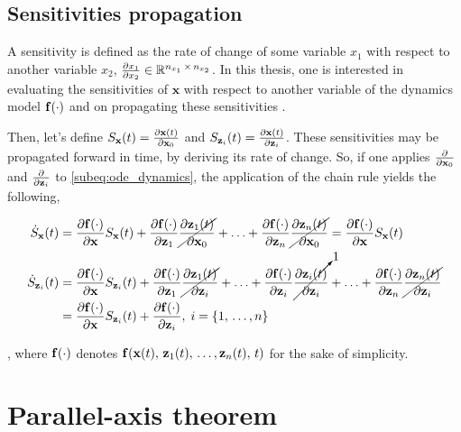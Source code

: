 \subsection*{Sensitivities propagation}
\label{subsection:sensitivitiespropagation}

A sensitivity is defined as the rate of change of some variable $x_1$ with respect to another variable $x_2$, $\pdv{x_1}{x_2} \in \mathbb{R}^{n_{x_1}\, \times\, n_{x_2}}$. In this thesis, one is interested in evaluating the sensitivities of $\mathbf{x}$ with respect to another variable of the dynamics model $\mathbf{f}(\cdot)$ and on propagating these sensitivities \cite{quirynen2015autogenerating}. 

Then, let's define $S_{\mathbf{x}}(t) = \pdv{\mathbf{x}(t)}{\mathbf{x}_0}$ and $S_{\mathbf{z}_i}(t) = \pdv{\mathbf{x}(t)}{\mathbf{z}_i}$. These sensitivities may be propagated forward in time, by deriving its rate of change. So, if one applies $\pdv{}{\mathbf{x}_0}$ and $\pdv{}{\mathbf{z}_i}$  to \ref{subeq:ode_dynamics}, the application of the chain rule yields the following,

\begin{equation}
\begin{aligned}
\dot{S}_{\mathbf{x}}(t) &= \pdv{\mathbf{f}(\cdot)}{\mathbf{x}} S_{\mathbf{x}}(t) + \pdv{\mathbf{f}(\cdot)}{\mathbf{z}_1} \cancel{\pdv{\mathbf{z}_1(t)}{\mathbf{x}_0}} + \ldots + \pdv{\mathbf{f}(\cdot)}{\mathbf{z}_n} \cancel{\pdv{\mathbf{z}_n(t)}{\mathbf{x}_0}} = \pdv{\mathbf{f}(\cdot)}{\mathbf{x}} S_{\mathbf{x}}(t)\\
\dot{S}_{\mathbf{z}_i}(t) &= \pdv{\mathbf{f}(\cdot)}{\mathbf{x}} S_{\mathbf{z}_i}(t) + \pdv{\mathbf{f}(\cdot)}{\mathbf{z}_1} \cancel{\pdv{\mathbf{z}_1(t)}{\mathbf{z}_i}} + \ldots + \pdv{\mathbf{f}(\cdot)}{\mathbf{z}_i} \cancelto{1}{\pdv{\mathbf{z}_i(t)}{\mathbf{z}_i}} + \ldots + \pdv{\mathbf{f}(\cdot)}{\mathbf{z}_n} \cancel{\pdv{\mathbf{z}_n(t)}{\mathbf{z}_i}}\\
&= \pdv{\mathbf{f}(\cdot)}{\mathbf{x}} S_{\mathbf{z}_i}(t) + \pdv{\mathbf{f}(\cdot)}{\mathbf{z}_i},\; i = \{1,\,\ldots,n\}
\end{aligned}
\label{eq:sensitivitiespropagation}
\end{equation}

\noindent, where $\mathbf{f}(\cdot)$ denotes $\mathbf{f}(\mathbf{x}(t),\,\mathbf{z}_1(t),\,\ldots,\mathbf{z}_n(t),\,t)$ for the sake of simplicity.

\section{Parallel-axis theorem}
\label{section:parallelAxisTheorem}

